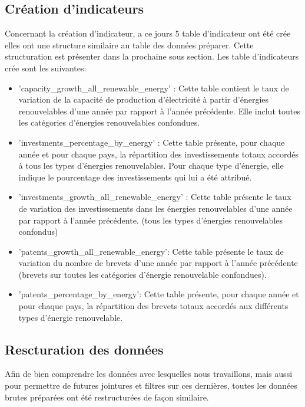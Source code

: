 \documentclass[12pt]{article}
\begin{document}
\subsection{Création d'indicateurs}

Concernant la création d'indicateur, a ce jours 5 table d'indicateur ont été 
crée elles ont une structure similaire au table des données préparer.
Cette structuration est présenter dans la prochaine sous section.
Les table d'indicateurs crée sont les suivantes:

\begin{itemize}
    \renewcommand{\labelitemi}{-}
    \item 'capacity\_growth\_all\_renewable\_energy' : Cette table contient le taux de variation de la capacité 
    de production d'électricité à partir d'énergies renouvelables d'une année par rapport à l'année précédente. 
    Elle inclut toutes les catégories d'énergies renouvelables confondues.
    \item 'investments\_percentage\_by\_energy' : Cette table présente, pour chaque année et pour 
chaque pays, la répartition des investissements totaux accordés à tous les types d'énergies renouvelables. 
Pour chaque type d'énergie, elle indique le pourcentage des investissements qui lui a été attribué.
    \item 'investments\_growth\_all\_renewable\_energy' : Cette table présente le taux de variation des 
    investissements dans les énergies renouvelables d'une année par rapport à l'année précédente. 
    (tous les types d'énergies renouvelables confondus)
    \item 'patents\_growth\_all\_renewable\_energy': Cette table présente le taux de variation
du nombre de brevets d'une année par rapport à l'année précédente (brevets sur toutes 
les catégories d'énergie renouvelable confondues).
    \item 'patents\_percentage\_by\_energy': Cette table présente, pour chaque année et pour chaque pays,
la répartition des brevets totaux accordés aux différents types d'énergie renouvelable.

\end{itemize}


\subsection{Rescturation des données}

Afin de bien comprendre les données avec lesquelles nous travaillons, mais aussi pour permettre de 
futures jointures et filtres sur ces dernières, toutes les données brutes préparées ont été 
restructurées de façon similaire.\newline
\end{document}
